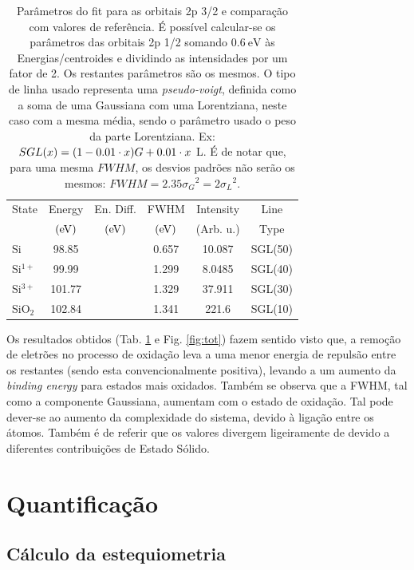 \documentclass[baaa]{baaa}
\begin{document}
\begin{table}[h!]
  \centering
  \caption{Parâmetros do fit para as orbitais 2p 3/2 e comparação com valores de referência\cite{Nist}. É possível calcular-se os parâmetros das orbitais 2p 1/2 somando $0.6\ \si{\electronvolt}$ às Energias/centroides e dividindo as intensidades por um fator de 2. Os restantes parâmetros são os mesmos. O tipo de linha usado representa uma \textit{pseudo-voigt}, definida como a soma de uma Gaussiana com uma Lorentziana, neste caso com a mesma média, sendo o parâmetro usado o peso da parte Lorentziana. Ex:$SGL\qty(x)=\qty(1-0.01\cdot x) G + 0.01\cdot x$ L. É de notar que, para uma mesma $FWHM$, os desvios padrões não serão os mesmos: $FWHM=2.35{\sigma_G}^2=2{\sigma_L}^2$.}
  \begin{tabular}{lccccc}
    \hline\hline\noalign{\smallskip}
    State & Energy &En. Diff.& FWHM& Intensity&Line\\
    & $\qty(\si{\electronvolt})$&$\qty(\si{\electronvolt})$& $\qty(\si{\electronvolt})$& (Arb. u.)&Type\\
    \hline\noalign{\smallskip}
    Si &98.85&& 0.657 &10.087&SGL(50)\\
    Si$^{1+}$&99.99&& 1.299 & 8.0485&SGL(40)\\
    Si$^{3+}$&101.77&&1.329&37.911&SGL(30)\\
    SiO$_2$ & 102.84&&1.341&221.6&SGL(10)\\
    \hline
    \end{tabular}
    \label{table:params}
\end{table}


Os resultados obtidos (Tab. \ref{table:params} e Fig. \ref{fig:tot}) fazem sentido visto que, a remoção de eletrões no processo de oxidação leva a uma menor energia de repulsão entre os restantes (sendo esta convencionalmente positiva), levando a um aumento da \textit{binding energy} para estados mais oxidados. Também se observa que a FWHM, tal como a componente Gaussiana, aumentam com o estado de oxidação. Tal pode dever-se ao aumento da complexidade do sistema, devido à ligação entre os átomos. Também é de referir que os valores divergem ligeiramente de \cite{Himpsel} devido a diferentes contribuições de Estado Sólido.



\section{Quantificação}

\subsection{Cálculo da estequiometria}
\end{document}
